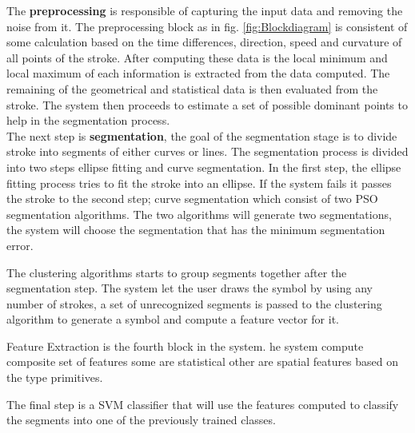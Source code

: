The \textbf{preprocessing} is responsible of capturing the input data and removing the noise from it. The preprocessing block as in fig.  \ref{fig:Blockdiagram}   is consistent of  some calculation based on    the time differences, direction, speed and curvature of all points of the stroke. After computing these data is the local minimum and local maximum of each information is extracted from the data computed. The remaining of the geometrical and statistical data is then evaluated from the stroke.  The system then proceeds to estimate a set of possible dominant points to help in the segmentation process.   \\
 
  
The  next step is \textbf{segmentation}, the goal of the segmentation stage is to divide stroke into segments of either curves or lines. The segmentation process is divided into two steps ellipse fitting and curve segmentation. In the first step, the ellipse fitting process tries to fit the stroke into an ellipse. If the system fails it passes the stroke to the second step; curve segmentation which consist of two PSO segmentation algorithms. The two algorithms will generate two segmentations, the system will choose the segmentation that has the minimum segmentation error.%

 The clustering algorithms starts to group segments together after the segmentation step. The system let the user draws the symbol by using any number of strokes, a set of unrecognized segments is passed to the clustering algorithm to generate a symbol and compute a feature vector for it.
 
 Feature Extraction is the fourth block in the system. he system compute composite set of features some are statistical other are spatial features based on the type primitives.%
  
   The final step is a SVM classifier that will use the features computed to classify the segments into one of the previously trained classes. %
 
